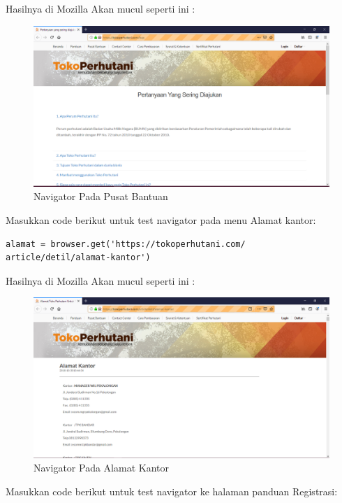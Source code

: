 Hasilnya  di Mozilla Akan mucul seperti ini :
\begin{figure}[h]
	\centering
	\includegraphics[scale=0.3]{figures/2hasil.PNG}
	\caption{Navigator Pada Pusat Bantuan}
\end{figure}

Masukkan code berikut untuk test navigator pada menu  Alamat kantor:
\begin{verbatim}
alamat = browser.get('https://tokoperhutani.com/
article/detil/alamat-kantor')
\end{verbatim}

Hasilnya  di Mozilla Akan mucul seperti ini :
\begin{figure}[h]
	\centering
	\includegraphics[scale=0.3]{figures/3hasil.PNG}
	\caption{Navigator Pada Alamat Kantor}
\end{figure}


Masukkan code berikut untuk test navigator ke halaman panduan Registrasi:


